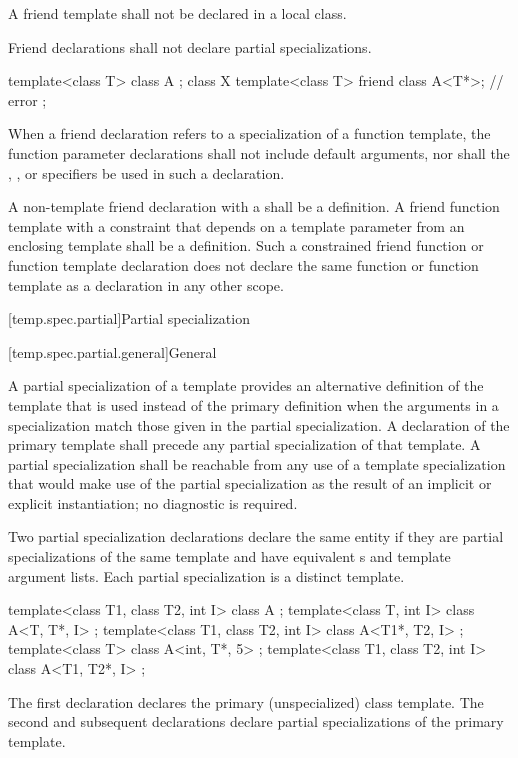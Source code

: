 \pnum
A friend template shall not be declared in a local class.

\pnum
Friend declarations shall not declare partial specializations.
\begin{example}
\begin{codeblock}
template<class T> class A { };
class X {
  template<class T> friend class A<T*>;         // error
};
\end{codeblock}
\end{example}

\pnum
When a friend declaration refers to a specialization of a function
template, the function parameter declarations shall not include
default arguments, nor shall
the , , or  specifiers
be used in such a declaration.

\pnum
A non-template friend declaration
with a 
shall be a definition.
A friend function template
with a constraint that depends on a template parameter from an enclosing template
shall be a definition.
Such a constrained friend function or function template declaration
does not declare the same function or function template as a declaration in any other scope.

[temp.spec.partial]{Partial specialization}

[temp.spec.partial.general]{General}

\pnum
{}%
A partial specialization of a template provides an alternative definition
of the template that is used instead of the primary definition when the
arguments in a specialization match those given in the partial
specialization.
A declaration of the primary template shall precede
any partial specialization of
that template.
A partial specialization shall be reachable from any use of a template
specialization that would make use of the partial specialization as the result of
an implicit or explicit instantiation; no diagnostic is required.

\pnum
Two partial specialization declarations declare the same entity
if they are partial specializations of the same template and have equivalent
s and template argument lists.
Each partial specialization is a distinct template.

\pnum
\begin{example}
\begin{codeblock}
template<class T1, class T2, int I> class A             { };
template<class T, int I>            class A<T, T*, I>   { };
template<class T1, class T2, int I> class A<T1*, T2, I> { };
template<class T>                   class A<int, T*, 5> { };
template<class T1, class T2, int I> class A<T1, T2*, I> { };
\end{codeblock}

The first declaration declares the primary (unspecialized) class template.
The second and subsequent declarations declare partial specializations of
the primary template.
\end{example}

